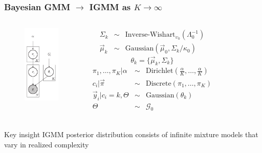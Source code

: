 \documentclass{beamer}
\begin{document}
\begin{frame}
\frametitle{Bayesian GMM $\rightarrow$ IGMM as $K \rightarrow \infty$ \citep{Rasmussen2000}}
\begin{columns}[t]
\begin{center}
\begin{figure}
\includegraphics[height=3.75cm]{figures/bgmm_graphical_model.pdf}
\end{figure}
\end{center}
{\tiny
\begin{eqnarray*}
 \Sigma_k &\sim& \mbox{Inverse-Wishart}_{\upsilon_0}( \Lambda_0^{-1}) \\ 
\vec \mu_k &\sim& \mbox{Gaussian}(\vec \mu_0,  \Sigma_k/\kappa_0)
\end{eqnarray*}
\[\theta_k = \{\vec \mu_k,\Sigma_k\}\]
\begin{eqnarray*}
\pi_1, \ldots, \pi_K | \alpha &\sim& \mbox{Dirichlet}(\frac{\alpha}{K}, \ldots, \frac{\alpha}{K}) \\
c_i | \vec \pi &\sim& \mbox{Discrete}(\pi_1, \ldots, \pi_K) \\
\vec y_i | c_i=k, \Theta &\sim& \mbox{Gaussian}(\theta_k) \\
\Theta &\sim& \mathcal{G}_0 \\
\end{eqnarray*}
}
\end{columns}
\begin{block}{Key insight}
IGMM posterior distribution consists of infinite mixture models that vary in realized complexity
\end{block}
{\footnotesize

}
\end{frame}
\end{document}
